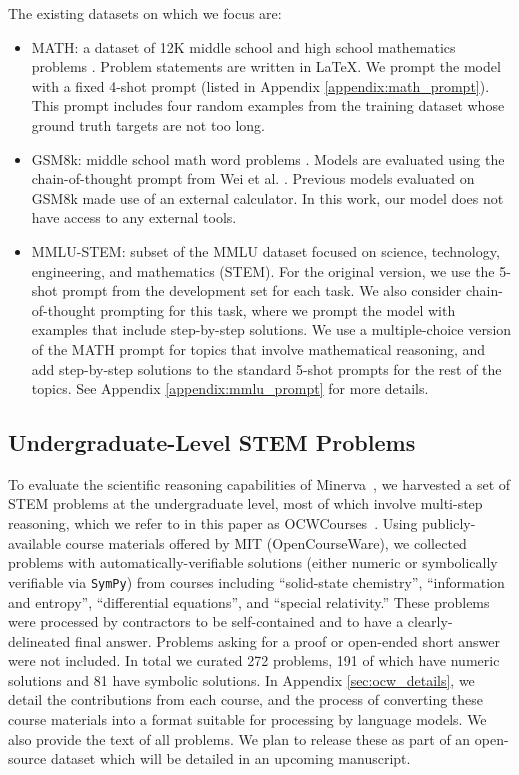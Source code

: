 The existing datasets on which we focus are:

\begin{itemize}
    \item MATH: a dataset of 12K middle school and high school mathematics problems \cite{MATH}. Problem statements are written in \LaTeX{}. We prompt the model with a fixed 4-shot prompt (listed in Appendix \ref{appendix:math_prompt}).
    This prompt includes four random examples from the training dataset whose ground truth targets are not too long.
    \item GSM8k: middle school math word problems \cite{gsm8k}. Models are evaluated using the chain-of-thought prompt from Wei et al. \cite{chain_of_thought}. Previous models evaluated on GSM8k made use of an external calculator. In this work, our model does not have access to any external tools. 
    \item MMLU-STEM: subset of the MMLU dataset \citep{MMLU} focused on science, technology, engineering, and mathematics (STEM). For the original version, we use the 5-shot prompt from the development set for each task. We also consider chain-of-thought prompting for this task, where we prompt the model with examples that include step-by-step solutions. We use a multiple-choice version of the MATH prompt for topics that involve mathematical reasoning, and add step-by-step solutions to the standard 5-shot prompts for the rest of the topics. See Appendix \ref{appendix:mmlu_prompt} for more details.

\end{itemize}

\subsection{Undergraduate-Level STEM Problems}

To evaluate the scientific reasoning capabilities of {Minerva~}\!, we harvested a set of STEM problems at the undergraduate level, most of which involve multi-step reasoning, which we refer to in this paper as {OCWCourses~}\!.  Using publicly-available course materials offered by MIT (OpenCourseWare), we collected problems with automatically-verifiable solutions (either numeric or symbolically verifiable via \texttt{SymPy}) from courses including ``solid-state chemistry'', ``information and entropy'', ``differential equations'', and ``special relativity.''  These problems were processed by contractors to be self-contained and to have a clearly-delineated final answer. Problems asking for a proof or open-ended short answer were not included.  In total we curated 272 problems, 191 of which have numeric solutions and 81 have symbolic solutions.  In Appendix \ref{sec:ocw_details}, we detail the contributions from each course, and the process of converting these course materials into a format suitable for processing by language models. We also provide the text of all problems.  We plan to release these as part of an open-source dataset which will be detailed in an upcoming manuscript.

